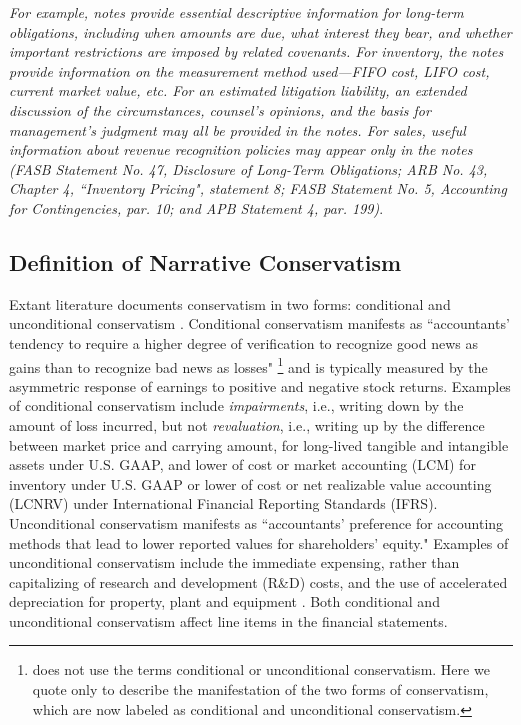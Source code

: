 \documentclass[letterpaper,11pt]{article}
\begin{document}
\begin{spacing}{1.5}
\begin{adjustwidth}{1cm}{1cm}
\begin{singlespace}
	\indent \textit{For example, notes provide essential descriptive information for long-term obligations, including when amounts are due, what interest they bear, and whether important restrictions are imposed by related covenants. For inventory, the notes provide information on the measurement method used---FIFO cost, LIFO cost, current market value, etc. For an estimated litigation liability, an extended discussion of the circumstances, counsel's opinions, and the basis for management's judgment may all be provided in the notes. For sales, useful information about revenue recognition policies may appear only in the notes (FASB Statement No. 47, Disclosure of Long-Term Obligations; ARB No. 43, Chapter 4, ``Inventory Pricing", statement 8; FASB Statement No. 5, Accounting for Contingencies, par. 10; and APB Statement 4, par. 199)}.
\end{singlespace}
\end{adjustwidth}

\subsection{Definition of Narrative Conservatism}\label{sec2.2}
Extant literature documents conservatism in two forms: conditional and unconditional conservatism \cite{beaverConditionalUnconditionalConservatism2005}. Conditional conservatism manifests as ``accountants' tendency to require a higher degree of verification to recognize good news as gains than to recognize bad news as losses" \cite[p. 7]{basuConservatismPrincipleAsymmetric1997}\footnote{ does not use the terms conditional or unconditional conservatism. Here we quote  only to describe the manifestation of the two forms of conservatism, which are now labeled as conditional and unconditional conservatism.} and is typically measured by the asymmetric response of earnings to positive and negative stock returns. Examples of conditional conservatism include \textit{impairments}, i.e., writing down by the amount of loss incurred, but not \textit{revaluation}, i.e., writing up by the difference between market price and carrying amount, for long-lived tangible and intangible assets under U.S. GAAP, and lower of cost or market accounting (LCM) for inventory under U.S. GAAP or lower of cost or net realizable value accounting (LCNRV) under International Financial Reporting Standards (IFRS). Unconditional conservatism manifests as ``accountants' preference for accounting methods that lead to lower reported values for shareholders' equity." \cite[p. 8]{basuConservatismPrincipleAsymmetric1997} Examples of unconditional conservatism include the immediate expensing, rather than capitalizing of research and development (R\&D) costs, and the use of accelerated depreciation for property, plant and equipment . Both conditional and unconditional conservatism affect line items in the financial statements. 


\end{spacing}
\end{document}
